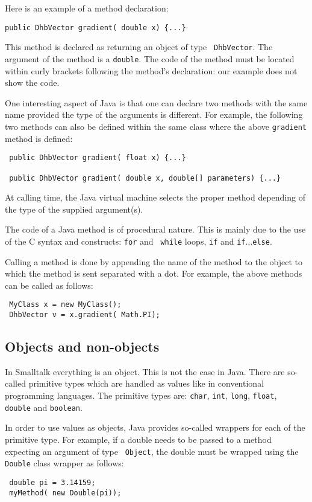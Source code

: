 \documentclass[twoside]{book}
\begin{document}
\noindent Here is an example of a method declaration:
\begin{verbatim}
public DhbVector gradient( double x) {...}
\end{verbatim}
This method is declared as returning an object of type {\tt
DhbVector}. The argument of the method is a {\tt double}. The code
of the method must be located within curly brackets following the
method's declaration: our example does not show the code.

One interesting aspect of Java is that one can declare two methods
with the same name provided the type of the arguments is
different. For example, the following two methods can also be
defined within the same class where the above {\tt gradient}
method is defined:
\begin{verbatim}
 public DhbVector gradient( float x) {...}

 public DhbVector gradient( double x, double[] parameters) {...}
\end{verbatim}
At calling time, the Java virtual machine selects the proper
method depending of the type of the supplied argument(s).

The code of a Java method is of procedural nature. This is mainly
due to the use of the C syntax and constructs: {\tt for} and {\tt
while} loops, {\tt if} and {\tt if$\ldots$else}.

Calling a method is done by appending the name of the method to
the object to which the method is sent separated with a dot. For
example, the above methods can be called as follows:
\begin{verbatim}
 MyClass x = new MyClass();
 DhbVector v = x.gradient( Math.PI);
\end{verbatim}


\subsection{Objects and non-objects}
In Smalltalk everything is an object. This is not the case in
Java. There are so-called primitive types which are handled as
values like in conventional programming languages. The primitive
types are: {\tt char}, {\tt int}, {\tt long}, {\tt float}, {\tt
double} and {\tt boolean}.

In order to use values as objects, Java provides so-called
wrappers for each of the primitive type. For example, if a double
needs to be passed to a method expecting an argument of type {\tt
Object}, the double must be wrapped using the {\tt Double} class
wrapper as follows:
\begin{verbatim}
 double pi = 3.14159;
 myMethod( new Double(pi));
\end{verbatim}
\end{document}
